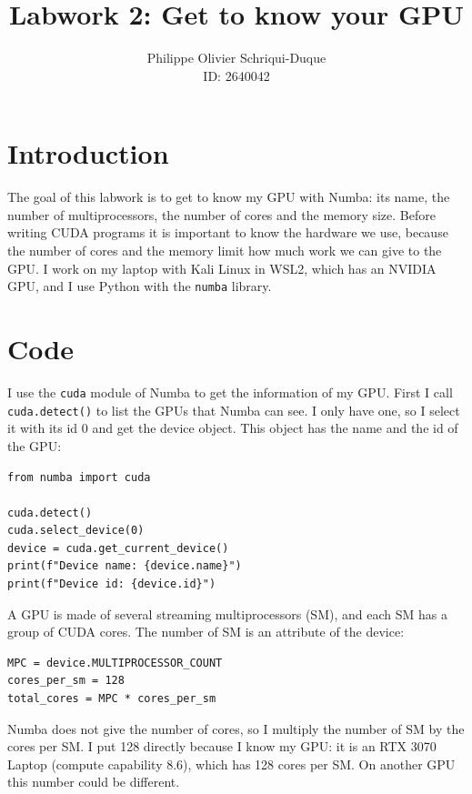 \documentclass{report}
\begin{document}
\title{Labwork 2: Get to know your GPU}
\author{Philippe Olivier Schriqui-Duque \\ ID: 2640042}
\date{}
\maketitle

\section*{Introduction}

The goal of this labwork is to get to know my GPU with Numba: its name, the number of
multiprocessors, the number of cores and the memory size.
Before writing CUDA programs it is important to know the hardware we use, because the number
of cores and the memory limit how much work we can give to the GPU.
I work on my laptop with Kali Linux in WSL2, which has an NVIDIA GPU, and I use Python with the
\texttt{numba} library.

\section*{Code}

I use the \texttt{cuda} module of Numba to get the information of my GPU.
First I call \texttt{cuda.detect()} to list the GPUs that Numba can see. I only have one,
so I select it with its id 0 and get the device object. This object has the name and the id
of the GPU:

\begin{verbatim}
from numba import cuda

cuda.detect()
cuda.select_device(0)
device = cuda.get_current_device()
print(f"Device name: {device.name}")
print(f"Device id: {device.id}")
\end{verbatim}

A GPU is made of several streaming multiprocessors (SM), and each SM has a group of CUDA cores.
The number of SM is an attribute of the device:

\begin{verbatim}
MPC = device.MULTIPROCESSOR_COUNT
cores_per_sm = 128
total_cores = MPC * cores_per_sm
\end{verbatim}

Numba does not give the number of cores, so I multiply the number of SM by the cores per SM.
I put 128 directly because I know my GPU: it is an RTX 3070 Laptop (compute capability 8.6),
which has 128 cores per SM. On another GPU this number could be different.
\end{document}
